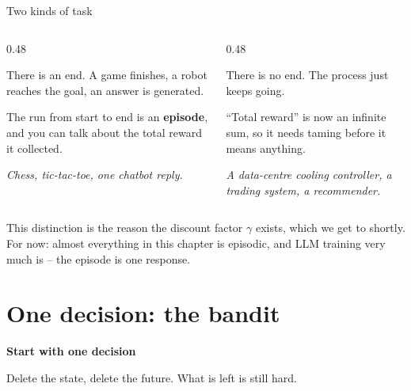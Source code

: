 \documentclass[aspectratio=169]{beamer}
\begin{document}
\begin{frame}{Two kinds of task}
  \begin{columns}[T]
    \begin{column}{0.48\textwidth}
      \begin{tcolorbox}[colback=armblue!8, colframe=armblue, boxrule=0.6pt, arc=2pt,
                        title={\textbf{Episodic}}]
        \small
        There is an end. A game finishes, a robot reaches the goal, an answer is generated.

        \vskip 4pt
        The run from start to end is an \textbf{episode}, and you can talk about the total
        reward it collected.

        \vskip 4pt
        \emph{Chess, tic-tac-toe, one chatbot reply.}
      \end{tcolorbox}
    \end{column}
    \begin{column}{0.48\textwidth}
      \begin{tcolorbox}[colback=paramgreen!8, colframe=paramgreen, boxrule=0.6pt, arc=2pt,
                        title={\textbf{Continuing}}]
        \small
        There is no end. The process just keeps going.

        \vskip 4pt
        ``Total reward'' is now an infinite sum, so it needs taming before it means anything.

        \vskip 4pt
        \emph{A data-centre cooling controller, a trading system, a recommender.}
      \end{tcolorbox}
    \end{column}
  \end{columns}

  \vskip 10pt
  \begin{tcolorbox}[colback=lightbg, colframe=popblue, boxrule=0.6pt, arc=2pt]
    \small
    This distinction is the reason the discount factor $\gamma$ exists, which we get to shortly.
    For now: almost everything in this chapter is episodic, and LLM training very much is --
    the episode is one response.
  \end{tcolorbox}
\end{frame}

\section{One decision: the bandit}
\begin{frame}[plain]
  \begin{center}
    \vskip 1.6cm
    {\Huge\bfseries\color{popblue}Start with one decision}

    \vskip 0.6cm
    {\large Delete the state, delete the future. What is left is still hard.}
  \end{center}
\end{frame}
\end{document}
